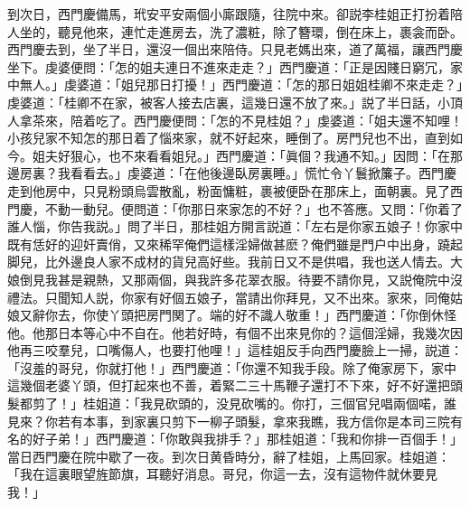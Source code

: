 到次日，西門慶備馬，玳安平安兩個小廝跟隨，往院中來。卻説李桂姐正打扮着陪人坐的，聽見他來，連忙走進房去，洗了濃粧，除了簪環，倒在床上，裹衾而卧。西門慶去到，坐了半日，還沒一個出來陪侍。只見老媽出來，道了萬福，讓西門慶坐下。虔婆便問：「怎的姐夫連日不進來走走？」西門慶道：「正是因賤日窮冗，家中無人。」虔婆道：「姐兒那日打擾！」西門慶道：「怎的那日姐姐桂卿不來走走？」虔婆道：「桂卿不在家，被客人接去店裏，這幾日還不放了來。」説了半日話，小頂人拿茶來，陪着吃了。西門慶便問：「怎的不見桂姐？」虔婆道：「姐夫還不知哩！小孩兒家不知怎的那日着了惱來家，就不好起來，睡倒了。房門兒也不出，直到如今。姐夫好狠心，也不來看看姐兒。」西門慶道：「眞個？我通不知。」因問：「在那邊房裏？我看看去。」虔婆道：「在他後邊臥房裏睡。」慌忙令丫鬟掀簾子。西門慶走到他房中，只見粉頭烏雲散亂，粉面慵粧，裹被便卧在那床上，面朝裏。見了西門慶，不動一動兒。便問道：「你那日來家怎的不好？」也不答應。又問：「你着了誰人惱，你告我説。」問了半日，那桂姐方開言説道：「左右是你家五娘子！你家中既有恁好的迎奸賣俏，又來稀罕俺們這樣淫婦做甚麽？俺們雖是門户中出身，蹺起脚兒，比外邊良人家不成材的貨兒高好些。我前日又不是供唱，我也送人情去。大娘倒見我甚是親熱，又那兩個，與我許多花翠衣服。待要不請你見，又説俺院中沒禮法。只聞知人説，你家有好個五娘子，當請出你拜見，又不出來。家來，同俺姑娘又辭你去，你使丫頭把房門関了。端的好不識人敬重！」西門慶道：「你倒休怪他。他那日本等心中不自在。他若好時，有個不出來見你的？這個淫婦，我幾次因他再三咬羣兒，口嘴傷人，也要打他哩！」這桂姐反手向西門慶臉上一掃，説道：「沒羞的哥兒，你就打他！」西門慶道：「你還不知我手段。除了俺家房下，家中這幾個老婆丫頭，但打起來也不善，着緊二三十馬鞭子還打不下來，好不好還把頭髮都剪了！」桂姐道：「我見砍頭的，没見砍嘴的。你打，三個官兒唱兩個喏，誰見來？你若有本事，到家裏只剪下一柳子頭髮，拿來我瞧，我方信你是本司三院有名的好子弟！」西門慶道：「你敢與我排手？」那桂姐道：「我和你排一百個手！」當日西門慶在院中歇了一夜。到次日黄昏時分，辭了桂姐，上馬回家。桂姐道：「我在這裏眼望旌節旗，耳聽好消息。哥兒，你這一去，沒有這物件就休要見我！」

